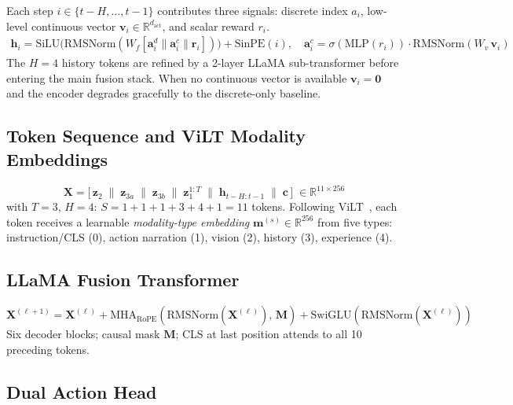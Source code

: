 \documentclass{article}
\begin{document}
Each step $i\in\{t{-}H,\ldots,t{-}1\}$ contributes three signals:
discrete index $a_i$, low-level continuous vector $\mathbf{v}_i\in\mathbb{R}^{d_{\mathrm{act}}}$,
and scalar reward $r_i$.
\begin{align}
  \mathbf{h}_i = \mathrm{SiLU}\!\bigl(
    \mathrm{RMSNorm}(W_f[\mathbf{a}_i^{d}\|\mathbf{a}_i^{c}\|\mathbf{r}_i])
  \bigr) + \mathrm{SinPE}(i),
  \quad \mathbf{a}_i^{c} = \sigma(\mathrm{MLP}(r_i))\cdot\mathrm{RMSNorm}(W_v\,\mathbf{v}_i)
  \label{eq:hist_tok}
\end{align}
The $H{=}4$ history tokens are refined by a 2-layer LLaMA sub-transformer
before entering the main fusion stack.
When no continuous vector is available $\mathbf{v}_i{=}\mathbf{0}$ and the
encoder degrades gracefully to the discrete-only baseline.

\subsection{Token Sequence and ViLT Modality Embeddings}
\label{sec:tokens}
\begin{equation}
  \mathbf{X} = \bigl[\,
    \mathbf{z}_2 \;\|\; \mathbf{z}_{3a} \;\|\; \mathbf{z}_{3b} \;\|\;
    \mathbf{z}_1^{1:T} \;\|\; \mathbf{h}_{t-H:t-1} \;\|\; \mathbf{c}
  \,\bigr] \;\in\mathbb{R}^{11\times256}
  \label{eq:sequence}
\end{equation}
with $T{=}3$, $H{=}4$: $S = 1{+}1{+}1{+}3{+}4{+}1 = 11$ tokens.
Following ViLT~\citep{kim2021vilt}, each token receives a learnable
\emph{modality-type embedding} $\mathbf{m}^{(s)}\!\in\!\mathbb{R}^{256}$
from five types: instruction/CLS (0), action narration (1), vision (2),
history (3), experience (4).

\subsection{LLaMA Fusion Transformer}
\label{sec:fusion}
\begin{equation}
  \mathbf{X}^{(\ell+1)}
  = \mathbf{X}^{(\ell)}
  + \mathrm{MHA}_{\mathrm{RoPE}}\!\left(\mathrm{RMSNorm}(\mathbf{X}^{(\ell)}),\,\mathbf{M}\right)
  + \mathrm{SwiGLU}\!\left(\mathrm{RMSNorm}(\mathbf{X}^{(\ell)})\right)
  \label{eq:llama}
\end{equation}
Six decoder blocks; causal mask $\mathbf{M}$; CLS at last position attends
to all 10 preceding tokens.

\subsection{Dual Action Head}
\end{document}
